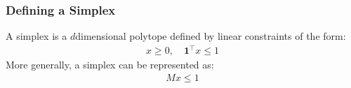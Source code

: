 \documentclass[letterpaper,10pt,english,openany,oneside]{sphinxmanual}
\begin{document}
\begin{sphinxVerbatim}[commandchars=\\\{\}]
    
\end{sphinxVerbatim}


\subsubsection{Defining a Simplex}
\label{\detokenize{user-guide/defining-parameter-space:defining-a-simplex}}
\sphinxAtStartPar
A simplex is a \(d\)\sphinxhyphen{}dimensional polytope defined by linear constraints of the form:
\begin{equation*}
\begin{split}x \ge 0, \quad \mathbf{1}^\top x \le 1\end{split}
\end{equation*}
\sphinxAtStartPar
More generally, a simplex can be represented as:
\begin{equation*}
\begin{split}M x \le 1\end{split}
\end{equation*}
\begin{sphinxVerbatim}[commandchars=\\\{\}]
 
\end{sphinxVerbatim}
\end{document}
